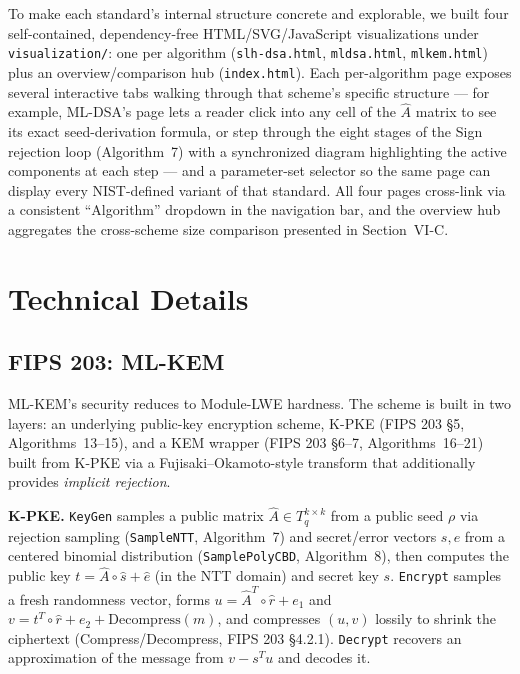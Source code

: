 \documentclass[10pt,conference]{IEEEtran}
\begin{document}
To make each standard's internal structure concrete and explorable, we
built four self-contained, dependency-free HTML/SVG/JavaScript
visualizations under \texttt{visualization/}: one per algorithm
(\texttt{slh-dsa.html}, \texttt{mldsa.html}, \texttt{mlkem.html}) plus an
overview/comparison hub (\texttt{index.html}). Each per-algorithm page
exposes several interactive tabs walking through that scheme's specific
structure --- for example, ML-DSA's page lets a reader click into any
cell of the $\hat A$ matrix to see its exact seed-derivation formula, or
step through the eight stages of the Sign rejection loop (Algorithm~7)
with a synchronized diagram highlighting the active components at each
step --- and a parameter-set selector so the same page can display every
NIST-defined variant of that standard. All four pages cross-link via a
consistent ``Algorithm'' dropdown in the navigation bar, and the overview
hub aggregates the cross-scheme size comparison presented in
Section~VI-C.

\section{Technical Details}

\subsection{FIPS 203: ML-KEM}

ML-KEM's security reduces to Module-LWE hardness. The scheme is built in
two layers: an underlying public-key encryption scheme, K-PKE (FIPS 203
\S5, Algorithms~13--15), and a KEM wrapper (FIPS 203 \S6--7,
Algorithms~16--21) built from K-PKE via a Fujisaki--Okamoto-style
transform that additionally provides \emph{implicit rejection}.

\textbf{K-PKE.} \texttt{KeyGen} samples a public matrix
$\hat A \in T_q^{k \times k}$ from a public seed $\rho$ via rejection
sampling (\texttt{SampleNTT}, Algorithm~7) and secret/error vectors
$s, e$ from a centered binomial distribution (\texttt{SamplePolyCBD},
Algorithm~8), then computes the public key $t = \hat A \circ \hat s + \hat
e$ (in the NTT domain) and secret key $s$. \texttt{Encrypt} samples a
fresh randomness vector, forms $u = \hat A^T \circ \hat r + e_1$ and
$v = t^T \circ \hat r + e_2 + \mathrm{Decompress}(m)$, and compresses
$(u, v)$ lossily to shrink the ciphertext (Compress/Decompress, FIPS 203
\S4.2.1). \texttt{Decrypt} recovers an approximation of the message from
$v - s^T u$ and decodes it.
\end{document}
